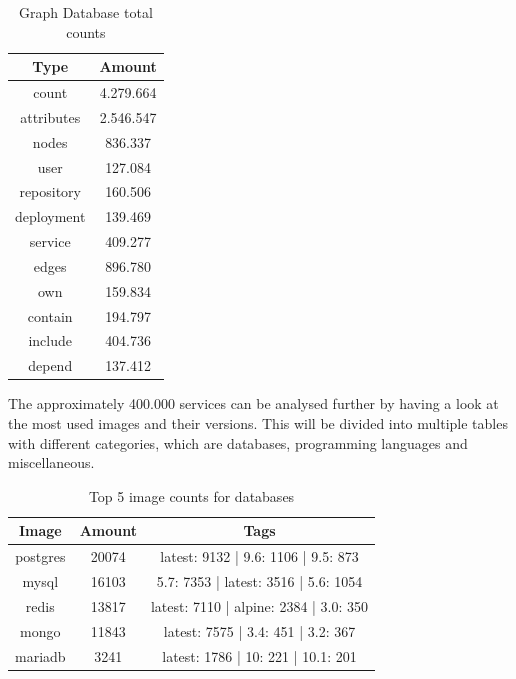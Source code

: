 \begin{table}[h!]
    \centering
    \begin{tabular}{ |c|c| }
    \hline
    Type & Amount \\
    \hline
         count & 4.279.664 \\
         attributes & 2.546.547 \\
         \hline
         nodes & 836.337 \\
         \hline
         user & 127.084 \\
         repository & 160.506\\
         deployment & 139.469\\
         service & 409.277\\
         \hline
         edges & 896.780 \\
         \hline
         own & 159.834 \\
         contain & 194.797 \\
         include & 404.736 \\
         depend & 137.412 \\
    \hline
    \end{tabular}
    \caption{Graph Database total counts}
    \label{graph_database_total_counts}
\end{table}

The approximately 400.000 services can be analysed further by having a look at the most used images and their versions. This will be divided into multiple tables with different categories, which are databases, programming languages and miscellaneous.

\begin{table}[h!]
    \centering
    \begin{tabular}{ |c|c|c| }
    \hline
    Image & Amount & Tags \\
    \hline
         postgres & 20074 & latest: 9132 | 9.6: 1106 | 9.5: 873\\
         mysql & 16103 & 5.7: 7353 | latest: 3516 | 5.6: 1054\\
         redis & 13817 & latest: 7110 | alpine: 2384 | 3.0: 350\\
         mongo & 11843 & latest: 7575 | 3.4: 451 | 3.2: 367\\
         mariadb & 3241 & latest: 1786 | 10: 221 | 10.1: 201\\
    \hline
    \end{tabular}
    \caption{Top 5 image counts for databases}
    \label{table_image_databases}
\end{table}

